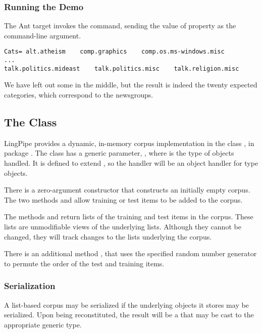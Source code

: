 \subsubsection{Running the Demo}

The Ant target  invokes the
 command, sending the value of property
 as the command-line argument.
%
\begin{verbatim}
Cats= alt.atheism    comp.graphics    comp.os.ms-windows.misc
...
talk.politics.mideast    talk.politics.misc    talk.religion.misc
\end{verbatim}
%
We have left out some in the middle, but the result is indeed the
twenty expected categories, which correspond to the newsgroups.


\subsection{The  Class}

LingPipe provides a dynamic, in-memory corpus implementation in the
class , in package .  The
class has a generic parameter, , where  is
the type of objects handled.  It is defined to extend
, so the handler will be an object
handler for type  objects.

There is a zero-argument constructor  that
constructs an initially empty corpus.  The two methods
 and  allow training or test items
to be added to the corpus.

The methods  and  return lists of
the training and test items in the corpus.  These lists are
unmodifiable views of the underlying lists.  Although they cannot be
changed, they will track changes to the lists underlying the corpus.

There is an additional method , that uses
the specified random number generator to permute the order of the test
and training items.

\subsubsection{Serialization}

A list-based corpus may be serialized if the underlying objects
it stores may be serialized.  Upon being reconstituted, the result
will be a  that may be cast to the appropriate
generic type.

